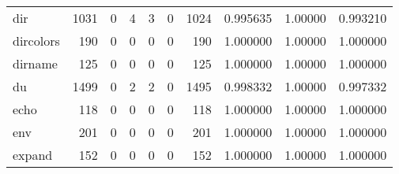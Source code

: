\begin{tabular}{lrrrrrrrrr}
dir       &                   1031 &                                  0 &                                 4 &                                3 &                                 0 &                            1024 &                                0.995635 &                                1.00000 &                             0.993210 \\
dircolors &                    190 &                                  0 &                                 0 &                                0 &                                 0 &                             190 &                                1.000000 &                                1.00000 &                             1.000000 \\
dirname   &                    125 &                                  0 &                                 0 &                                0 &                                 0 &                             125 &                                1.000000 &                                1.00000 &                             1.000000 \\
du        &                   1499 &                                  0 &                                 2 &                                2 &                                 0 &                            1495 &                                0.998332 &                                1.00000 &                             0.997332 \\
echo      &                    118 &                                  0 &                                 0 &                                0 &                                 0 &                             118 &                                1.000000 &                                1.00000 &                             1.000000 \\
env       &                    201 &                                  0 &                                 0 &                                0 &                                 0 &                             201 &                                1.000000 &                                1.00000 &                             1.000000 \\
expand    &                    152 &                                  0 &                                 0 &                                0 &                                 0 &                             152 &                                1.000000 &                                1.00000 &                             1.000000 \\

\end{tabular}
